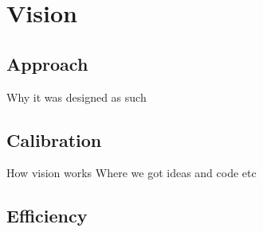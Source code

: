 \section{Vision}
\subsection{Approach}
Why it was designed as such

\subsection{Calibration}

How vision works
Where we got ideas and code etc

\subsection{Efficiency}